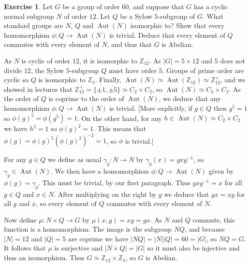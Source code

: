 \documentclass{amsart}
\DeclareMathOperator{\Aut}{Aut}
\newcommand{\xra}{\xrightarrow}
\renewcommand{\:}{\colon}
\newcommand{\ov}{\overline}
\newcommand{\tm}{\times}
\newcommand{\Z}{\mathbb{Z}}
\newcommand{\gm}        {\gamma}
\theoremstyle{definition}
\newtheorem{exercise}{Exercise}
\newenvironment{solution}{{\noindent\bf Solution:}}{}
\begin{document}
\begin{exercise}
 Let $G$ be a group of order $60$, and suppose that $G$ has a cyclic
 normal subgroup $N$ of order $12$.  Let $Q$ be a Sylow $5$-subgroup of
 $G$.  What standard groups are $N$, $Q$ and $\Aut(N)$ isomorphic to?
 Show that every homomorphism $\phi\:Q\xra{}\Aut(N)$ is trivial.
 Deduce that every element of $Q$ commutes with every element of $N$,
 and thus that $G$ is Abelian.
\end{exercise}
\begin{solution}
 As $N$ is cyclic of order $12$, it is isomorphic to $\Z_{12}$.  As
 $|G|=5\tm 12$ and $5$ does not divide $12$, the Sylow $5$-subgroup
 $Q$ must have order $5$.  Groups of prime order are cyclic so $Q$ is
 isomorphic to $\Z_5$.  Finally,
 $\Aut(N)\simeq\Aut(\Z_{12})\simeq\Z_{12}^\tm$, and we showed in
 lectures that $\Z_{12}^\tm=\{\ov{\pm 1},\ov{\pm 5}\}\simeq C_2\tm
 C_2$, so $\Aut(N)\simeq C_2\tm C_2$.  As the order of $Q$ is coprime
 to the order of $\Aut(N)$, we deduce that any homomorphism
 $\phi\:Q\xra{}\Aut(N)$ is trivial.  [More explicitly, if $g\in Q$
 then $g^5=1$ so $\phi(g)^5=\phi(g^5)=1$.  On the other hand, for any
 $h\in\Aut(N)\simeq C_2\tm C_2$ we have $h^2=1$ so $\phi(g)^2=1$.
 This means that $\phi(g)=\phi(g)^5(\phi(g)^2)^{-2}=1$, so $\phi$ is
 trivial.]

 For any $g\in Q$ we define as usual $\gm_g\:N\xra{}N$ by
 $\gm_g(x)=gxg^{-1}$, so $\gm_g\in\Aut(N)$.  We then have a
 homomorphism $\phi\:Q\xra{}\Aut(N)$ given by $\phi(g)=\gm_g$.  This
 must be trivial, by our first paragraph.  Thus $gxg^{-1}=x$ for all
 $g\in Q$ and $x\in N$.  After multiplying on the right by $g$ we
 deduce that $gx=xg$ for all $g$ and $x$, so every element of $Q$
 commutes with every element of $N$.  

 Now define $\mu\:N\tm Q\xra{}G$ by $\mu(x,g)=xg=gx$.  As $N$ and $Q$
 commute, this function is a homomorphism.  The image is the subgroup
 $NQ$, and because $|N|=12$ and $|Q|=5$ are coprime we have
 $|NQ|=|N||Q|=60=|G|$, so $NQ=G$.  It follows that $\mu$ is surjective
 and $|N\tm Q|=|G|$ so it must also be injective and thus an
 isomorphism.  Thus $G\simeq \Z_{12}\tm\Z_5$, so $G$ is Abelian.
\end{solution}
\end{document}
